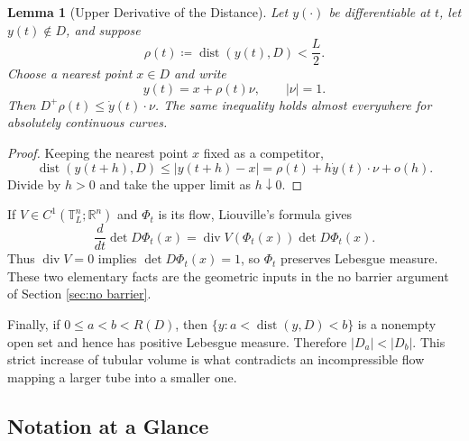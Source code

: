 \documentclass[11pt,reqno,noamsfonts]{amsart}
\newtheorem{lemma}[theorem]{Lemma}
\theoremstyle{definition}
\theoremstyle{remark}
\newcommand{\R}{\mathbb R}
\newcommand{\T}{\mathbb T}
\newcommand{\dist}{\operatorname{dist}}
\begin{document}
\begin{lemma}[Upper Derivative of the Distance]\label{lem:distance-Dini-background}
Let $y(\cdot)$ be differentiable at $t$, let $y(t)\notin D$, and suppose
\[
  \rho(t)\coloneqq \dist(y(t),D)<\frac L2.
\]
Choose a nearest point $x\in D$ and write
\[
  y(t)=x+\rho(t)\nu,
  \qquad |\nu|=1.
\]
Then
  $D^+\rho(t)\le \dot y(t)\cdot\nu$.
The same inequality holds almost everywhere for absolutely continuous curves.
\end{lemma}

\begin{proof}
Keeping the nearest point $x$ fixed as a competitor,
\[
  \dist(y(t+h),D)
  \le |y(t+h)-x|
  =\rho(t)+h\dot y(t)\cdot\nu+o(h).
\]
Divide by $h>0$ and take the upper limit as $h\downarrow0$.
\end{proof}

If $V\in C^1(\T_L^n;\R^n)$ and $\Phi_t$ is its flow, Liouville's formula gives
\[
  \frac{d}{dt}\det D\Phi_t(x)
  =\operatorname{div}V(\Phi_t(x))\det D\Phi_t(x).
\]
Thus $\operatorname{div}V=0$ implies
  $\det D\Phi_t(x)=1$,
so $\Phi_t$ preserves Lebesgue measure. These two elementary facts are the geometric inputs in the no barrier argument of Section \ref{sec:no barrier}.

Finally, if $0\le a<b<R(D)$, then
  $\{y:a<\dist(y,D)<b\}$
is a nonempty open set and hence has positive Lebesgue measure. Therefore $|D_a|<|D_b|$. This strict increase of tubular volume is what contradicts an incompressible flow mapping a larger tube into a smaller one.

\subsection{Notation at a Glance}\label{app:notation}
\end{document}
